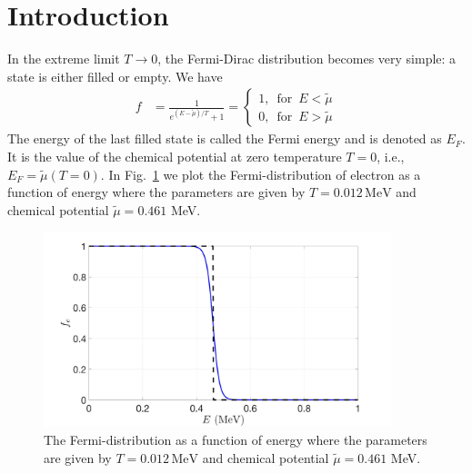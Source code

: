 \documentclass[sn-mathphys,Numbered]{sn-jnl}
\theoremstyle{thmstyleone}%
\theoremstyle{thmstyletwo}%
\theoremstyle{thmstylethree}%
\begin{document}


\maketitle

\section{Introduction}\label{sec1}
In the extreme limit $T\rightarrow0$, the Fermi-Dirac distribution becomes very simple: a state is either filled or empty. We have
\begin{align}\label{f_old}
f&=\frac{1}{e^{(E-\tilde{\mu})/T}+1}=\left\{\begin{array}{c}1,\,\,\,\mathrm{for}\,\,\,{E}<\tilde{\mu} \\0,\,\,\,\mathrm{for}\,\,\, {E}>\tilde{\mu}\end{array}\right.
\end{align}
The energy of the last filled state is called the Fermi energy and is denoted as $E_F$. It is the value of the chemical potential at zero temperature $T=0$, i.e., $E_F=\tilde\mu(T = 0)$. In Fig.~\ref{Electron_001} we plot the Fermi-distribution of electron as a function of energy where the parameters are given by $T=0.012\,\mathrm{MeV}$ and chemical potential $\tilde\mu=0.461$ MeV.

\begin{figure}[h]
\begin{center}
\includegraphics[width=0.9\textwidth]{./plot/Electron_distribution001}
\caption{The Fermi-distribution  as a function of energy where the parameters are given by $T=0.012\,\mathrm{MeV}$ and chemical potential $\tilde\mu=0.461$ MeV.}
\label{Electron_001}
\end{center}
\end{figure}
\end{document}
